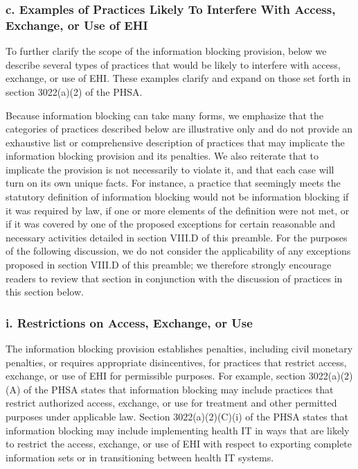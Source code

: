 \documentclass[twoside,11pt]{article}
\begin{document}
          \subsubsection{c. Examples of Practices Likely To Interfere With Access, Exchange, or Use of EHI}

          To further clarify the scope of the information blocking provision, below we describe several types of practices that would be likely to interfere with access, exchange, or use of EHI. These examples clarify and expand on those set forth in section 3022(a)(2) of the PHSA.


          Because information blocking can take many forms, we emphasize that the categories of practices described below are illustrative only and do not provide an exhaustive list or comprehensive description of practices that may implicate the information blocking provision and its penalties. We also reiterate that to implicate the provision is not necessarily to violate it, and that each case will turn on its own unique facts. For instance, a practice that seemingly meets the statutory definition of information blocking would not be information blocking if it was required by law, if one or more elements of the definition were not met, or if it was covered by one of the proposed exceptions for certain reasonable and necessary activities detailed in section VIII.D of this preamble. For the purposes of the following discussion, we do not consider the applicability of any exceptions proposed in section VIII.D of this preamble; we therefore strongly encourage readers to review that section in conjunction with the discussion of practices in this section below.


          \subsubsection{i. Restrictions on Access, Exchange, or Use}

          The information blocking provision establishes penalties, including civil monetary penalties, or requires appropriate disincentives, for practices that restrict access, exchange, or use of EHI for permissible purposes. For example, section 3022(a)(2)(A) of the PHSA states that information blocking may include practices that restrict authorized access, exchange, or use for treatment and other permitted purposes under applicable law. Section 3022(a)(2)(C)(i) of the PHSA states that information blocking may include implementing health IT in ways that are likely to restrict the access, exchange, or use of EHI with respect to exporting complete information sets or in transitioning between health IT systems.
\end{document}
